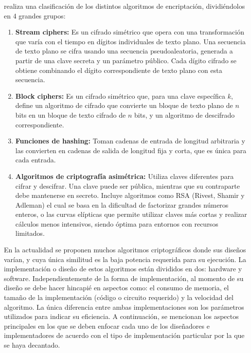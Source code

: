 \documentclass[a4paper,10pt]{article}
\begin{document}
	\textcite{wehbe2022criptografia} realiza una clasificación de los distintos algoritmos de encriptación, dividiéndolos en 4 grandes grupos:
	\begin{enumerate}
		\item \textbf{Stream ciphers: }Es un cifrado simétrico que opera con una transformación que varía con el tiempo en dígitos individuales de texto plano. Una secuencia de texto plano se cifra usando una secuencia pseudoaleatoria, generada a partir de una clave secreta y un parámetro público. Cada dígito cifrado se obtiene combinando el dígito correspondiente de texto plano con esta secuencia.
		\item \textbf{Block ciphers:} Es un cifrado simétrico que, para una clave específica $k$, define un algoritmo de cifrado que convierte un bloque de texto plano de $n$ bits en un bloque de texto cifrado de $n$ bits, y un algoritmo de descifrado correspondiente.
		\item \textbf{Funciones de hashing: }Toman cadenas de entrada de longitud arbitraria y las convierten en cadenas de salida de longitud fija y corta, que es única para cada entrada.
		\item \textbf{Algoritmos de criptografía asimétrica:} Utiliza claves diferentes para cifrar y descifrar. Una clave puede ser pública, mientras que su contraparte debe mantenerse en secreto. Incluye algoritmos como RSA (Rivest, Shamir y Adleman) el cual se basa en la dificultad de factorizar grandes números enteros, o las curvas elípticas que permite utilizar claves más cortas y realizar cálculos menos intensivos, siendo óptima para entornos con recursos limitados.
	\end{enumerate}
	En la actualidad se proponen muchos algoritmos criptográficos donde sus diseños varían, y cuya única similitud es la baja potencia requerida para su ejecución. La implementación o diseño de estos algoritmos están divididos en dos: hardware y software. Independientemente de la forma de implementación, al momento de su diseño se debe hacer hincapié en aspectos como: el consumo de memoria, el tamaño de la implementación (código o circuito requerido) y la velocidad del algoritmo. La única diferencia entre ambas implementaciones son los parámetros utilizados para indicar su eficiencia. A continuación, se mencionan los aspectos principales en los que se deben enfocar cada uno de los diseñadores e implementadores de acuerdo con el tipo de implementación particular por la que se haya decantado.
	
\end{document}
